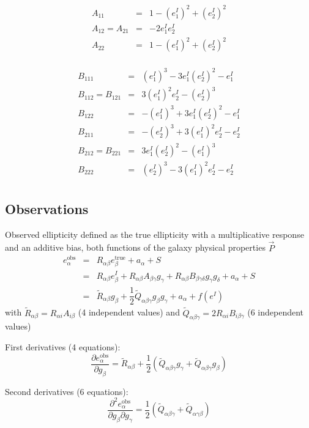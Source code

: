 \documentclass[a4paper]{article}
\begin{document}
$$
\begin{array}{rcl}
A_{11} &=&  1-(e_1^I)^2+(e_2^I)^2 \\
A_{12}=A_{21} &=&  -2e_1^I e_2^I \\
A_{22} &=&  1-(e_1^I)^2+(e_2^I)^2 \\
\end{array}
$$

$$
\begin{array}{rcl}
B_{111} &=&   (e_1^I)^3 -3e_1^I(e_2^I)^2 -e_1^I \\
B_{112}=B_{121} &=& 3(e_1^I)^2e_2^I -(e_2^I)^3 \\
B_{122} &=&  -(e_1^I)^3 +3e_1^I(e_2^I)^2 -e_1^I \\
B_{211} &=&  -(e_2^I)^3 +3(e_1^I)^2e_2^I -e_2^I \\
B_{212}=B_{221} &=& 3e_1^I(e_2^I)^2 -(e_1^I)^3 \\
B_{222} &=&   (e_2^I)^3 -3(e_1^I)^2e_2^I -e_2^I \\
\end{array}
$$

\subsection{Observations}

Observed ellipticity defined as the true ellipticity with a multiplicative response and an additive bias, both functions of the galaxy physical properties $\vec{P}$
$$
\begin{array}{lcl}
e_\alpha^\text{obs} &=& R_{\alpha\beta}e_\beta^\text{true} + a_\alpha + S \\
&=& R_{\alpha\beta}e_\beta^I + R_{\alpha\beta}A_{\beta\gamma}g_\gamma + R_{\alpha\beta}B_{\beta\gamma\delta}g_\gamma g_\delta + a_\alpha + S \\
&=& \tilde{R}_{\alpha\beta}g_\beta + \dfrac{1}{2}\tilde{Q}_{\alpha\beta\gamma}g_\beta g_\gamma + a_\alpha + f(e^I)
\end{array}
$$
with $\tilde{R}_{\alpha\beta} = R_{\alpha i}A_{i \beta}$ (4 independent values) and $\tilde{Q}_{\alpha\beta\gamma} = 2R_{\alpha i}B_{i \beta\gamma}$ (6 independent values)

First derivatives (4 equations):
$$
\dfrac{\partial e_\alpha^\text{obs}}{\partial g_\beta} = \tilde{R}_{\alpha\beta} + \dfrac{1}{2}\left( \tilde{Q}_{\alpha\beta\gamma}g_\gamma + \tilde{Q}_{\alpha\beta\gamma}g_\beta \right)
$$

Second derivatives (6 equations):
$$
\dfrac{\partial^2 e_\alpha^\text{obs}}{\partial g_\beta\partial g_\gamma} = \dfrac{1}{2}\left( \tilde{Q}_{\alpha\beta\gamma} + \tilde{Q}_{\alpha\gamma\beta} \right)
$$
\end{document}
